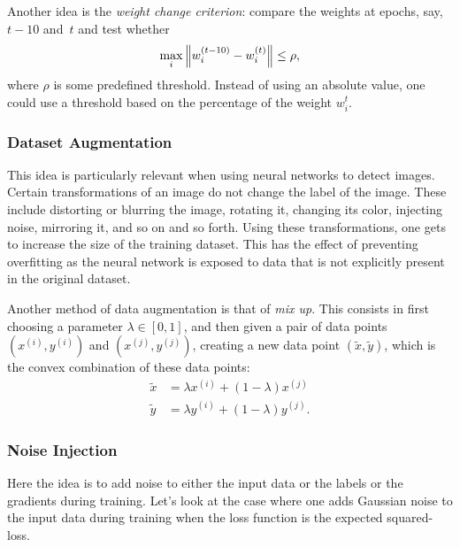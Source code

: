 Another idea is the \emph{weight change criterion}: compare the weights at epochs, 
say,  $t - 10$ and~$t$ and test whether
\[
    \max_{i} \left\lVert w_i^{(t - 10)} - w_i^{(t)}\right\rVert \le \rho,
\]  
where $\rho$ is some predefined threshold. Instead of using an absolute value, 
one could use a threshold based on the percentage of the weight $w_i^{t}$.

\subsubsection{Dataset Augmentation}
This idea is particularly relevant when using neural networks to detect images. 
Certain transformations of an image do not change the label of the image. These 
include distorting or blurring the image, rotating it, changing its color, 
injecting noise, mirroring it, and so on and so forth. Using these transformations, 
one gets to increase the size of the training dataset. This has the effect of 
preventing overfitting as the neural network is exposed to data that is not 
explicitly present in the original dataset.

Another method of data augmentation is that of \emph{mix up}. This consists in 
first choosing a parameter $\lambda \in [0, 1]$, and then given a pair of data points
$(x^{(i)}, y^{(i)})$ and $(x^{(j)}, y^{(j)})$, creating a new data point 
$(\tilde{x}, \tilde{y})$, which is the convex combination of these data points:
\begin{align}
    \tilde{x} & = \lambda x^{(i)} + (1 - \lambda) x^{(j)} \\
    \tilde{y} & = \lambda y^{(i)} + (1 - \lambda) y^{(j)}.
\end{align}    

\subsubsection{Noise Injection}
Here the idea is to add noise to either the input data or the labels or the 
gradients during training. Let's look at the case where one adds Gaussian 
noise to the input data during training when the loss function is the 
expected squared-loss. 

